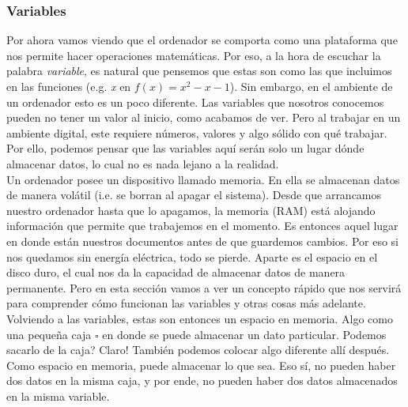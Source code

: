 \documentclass[10pt,letterpaper]{article}
\begin{document}
\subsubsection{Variables}
Por ahora vamos viendo que el ordenador se comporta como una plataforma que nos permite hacer operaciones matem\'aticas. Por eso, a la hora de escuchar la palabra \emph{variable}, es natural que pensemos que estas son como las que incluimos en las funciones (e.g. \emph{x} en $ f \left( x \right) = x^{2} - x - 1 $). Sin embargo, en el ambiente de un ordenador esto es un poco diferente. Las variables que nosotros conocemos pueden no tener un valor al inicio, como acabamos de ver. Pero al trabajar en un ambiente digital, este requiere n\'umeros, valores y algo s\'olido con qu\'e trabajar. Por ello, podemos pensar que las variables aqu\'i ser\'an solo un lugar d\'onde almacenar datos, lo cual no es nada lejano a la realidad.\\

Un ordenador posee un dispositivo llamado memoria. En ella se almacenan datos de manera vol\'atil (i.e. se borran al apagar el sistema). Desde que arrancamos nuestro ordenador hasta que lo apagamos, la memoria (RAM) est\'a alojando informaci\'on que permite que trabajemos en el momento. Es entonces aquel lugar en donde est\'an nuestros documentos antes de que guardemos cambios. Por eso si nos quedamos sin energ\'ia el\'ectrica, todo se pierde. Aparte es el espacio en el disco duro, el cual nos da la capacidad de almacenar datos de manera permanente. Pero en esta secci\'on vamos a ver un concepto r\'apido que nos servir\'a para comprender c\'omo funcionan las variables y otras cosas m\'as adelante.\\

Volviendo a las variables, estas son entonces un espacio en memoria. Algo como una peque\~na caja $ \square $ en donde se puede almacenar un dato particular. Podemos sacarlo de la caja? Claro! Tambi\'en podemos colocar algo diferente all\'i despu\'es. Como espacio en memoria, puede almacenar lo que sea. Eso s\'i, no pueden haber dos datos en la misma caja, y por ende, no pueden haber dos datos almacenados en la misma variable.\\
\end{document}
